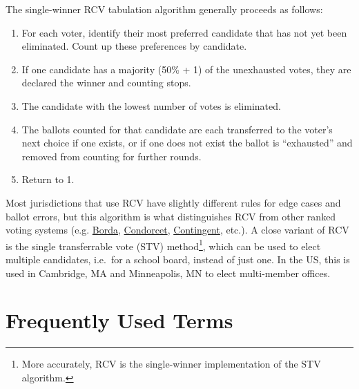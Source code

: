 \documentclass[12pt,twoside]{reedthesis}
\theoremstyle{definition}
\theoremstyle{definition}
\theoremstyle{definition}
\theoremstyle{remark}
\begin{document}
The single-winner RCV tabulation algorithm generally proceeds as
follows:
\begin{enumerate}
\def\labelenumi{\arabic{enumi}.}
\item
  For each voter, identify their most preferred candidate that has not
  yet been eliminated. Count up these preferences by candidate.
\item
  If one candidate has a majority (50\% + 1) of the unexhausted votes,
  they are declared the winner and counting stops.
\item
  The candidate with the lowest number of votes is eliminated.
\item
  The ballots counted for that candidate are each transferred to the
  voter's next choice if one exists, or if one does not exist the ballot
  is ``exhausted'' and removed from counting for further rounds.
\item
  Return to 1.
\end{enumerate}
Most jurisdictions that use RCV have slightly different rules for edge
cases and ballot errors, but this algorithm is what distinguishes RCV
from other ranked voting systems (e.g.
\href{https://www.electoral-reform.org.uk/voting-systems/types-of-voting-system/borda-count/}{Borda},
\href{http://web.math.princeton.edu/math_alive/Voting/Lab1/Condorcet.html}{Condorcet},
\href{https://www.uk-engage.org/2013/09/electoral-systems-whats-the-difference-between-contingent-voting-and-alternative-voting-systems/}{Contingent},
etc.). A close variant of RCV is the single transferrable vote (STV)
method\footnote{More accurately, RCV is the single-winner implementation
  of the STV algorithm.}, which can be used to elect multiple
candidates, i.e.~for a school board, instead of just one. In the US,
this is used in Cambridge, MA and Minneapolis, MN to elect multi-member
offices.

\hypertarget{frequently-used-terms}{%
\section{Frequently Used Terms}\label{frequently-used-terms}}
\end{document}
